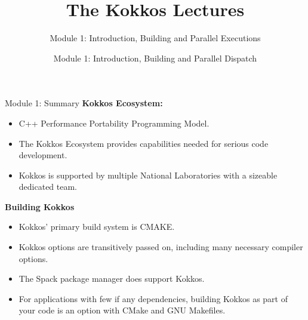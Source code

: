 

\def\sandid{SAND2020-7263 PE}

\title{The Kokkos Lectures}
\subtitle{Module 1: Introduction, Building and Parallel Executions}

\author{Module 1: Introduction, Building and Parallel Dispatch}



\shortfalse
\mediumtrue
\notoverviewtrue



% 

\begin{frame}
	\titlepage
\end{frame}













\begin{frame}{Module 1: Summary}
	\textbf{Kokkos Ecosystem:}
	\begin{itemize}
		\item C++ Performance Portability Programming Model.
		\item The Kokkos Ecosystem provides capabilities needed for serious code development.
		\item Kokkos is supported by multiple National Laboratories with a sizeable dedicated team.
	\end{itemize}

	\textbf{Building Kokkos}
	\begin{itemize}
    \item{Kokkos' primary build system is CMAKE.}
    \item{Kokkos options are transitively passed on, including many necessary compiler options.}
    \item{The Spack package manager does support Kokkos.}
    \item{For applications with few if any dependencies, building Kokkos as part of your code is an option with CMake and GNU Makefiles.}
	\end{itemize}
\end{frame}

